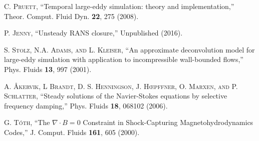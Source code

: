 


\begin{thebibliography}{99}

 \textsc {C. Pruett,}  ``Temporal large-eddy simulation: theory and implementation,'' Theor. Comput. Fluid Dyn. \textbf{22}, 275 (2008).

 \textsc {P. Jenny,}  ``Unsteady RANS closure,'' Unpublished (2016).

 \textsc {S. Stolz, N.A. Adams, and L. Kleiser,}  ``An approximate deconvolution model for large-eddy simulation with application to incompressible wall-bounded flows,'' Phys. Fluids  \textbf{13}, 997 (2001).

 \textsc {A. \AA kervik, L Brandt, D. S. Henningson, J. H\oe pffner, O. Marxen, and P. Schlatter,}  ``Steady solutions of the Navier-Stokes equations by selective frequency damping,'' Phys. Fluids  \textbf{18}, 068102 (2006).

 \textsc {G. T\'oth,}  ``The $\nabla \cdot B=0$ Constraint in Shock-Capturing Magnetohydrodynamics Codes,'' J. Comput. Fluids \textbf{161}, 605 (2000).

 
\end{thebibliography}
